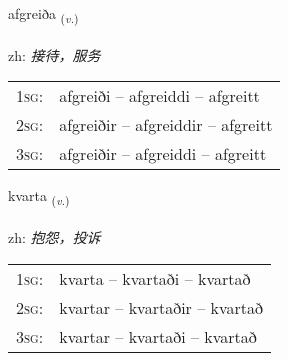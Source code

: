 \documentclass[frontgrid, backgrid]{flacards}\usepackage[]{graphicx}\usepackage[]{color}
\begin{document}
\renewcommand{\flhead}{\vskip5pt \fboxsep=0pt {\small\bfseries\footnotesize Sagnorð | 动词}}
\renewcommand{\fcfoot}{\vskip5pt \fboxsep=0pt \hspace{2pt}{\small\bfseries\footnotesize 2K}}

\renewcommand{\blhead}{\vskip5pt {\small\bfseries\footnotesize Sagnorð | 动词 }}
\renewcommand{\bcfoot}{\vskip5pt \hspace{2pt}{\small\bfseries\footnotesize 2K}}


{afgreiða \small{\textsubscript{(\textit{v.})}} \\[1ex] %
\textphonetic{[avkreiða]} \\
zh: \emph{接待，服务} \\  [2ex]
\renewcommand*{\arraystretch}{0.8}
\begin{tabular}{p{1cm}l}
\textsc{1sg}: & afgreiði -- afgreiddi -- afgreitt \\ 
\textsc{2sg}: & afgreiðir -- afgreiddir -- afgreitt \\ 
\textsc{3sg}: & afgreiðir -- afgreiddi -- afgreitt \\ 
\end{tabular}
}

\renewcommand{\flhead}{\vskip5pt \fboxsep=0pt {\small\bfseries\footnotesize Sagnorð | 动词}}
\renewcommand{\fcfoot}{\vskip5pt \fboxsep=0pt \hspace{2pt}{\small\bfseries\footnotesize 2K}}

\renewcommand{\blhead}{\vskip5pt {\small\bfseries\footnotesize Sagnorð | 动词 }}
\renewcommand{\bcfoot}{\vskip5pt \hspace{2pt}{\small\bfseries\footnotesize 2K}}


{kvarta \small{\textsubscript{(\textit{v.})}} \\[1ex] %
\textphonetic{[kʰvar̥ta]} \\
zh: \emph{抱怨，投诉} \\  [2ex]
\renewcommand*{\arraystretch}{0.8}
\begin{tabular}{p{1cm}l}
\textsc{1sg}: & kvarta -- kvartaði -- kvartað \\ 
\textsc{2sg}: & kvartar -- kvartaðir -- kvartað \\ 
\textsc{3sg}: & kvartar -- kvartaði -- kvartað \\ 
\end{tabular}
}
\end{document}
